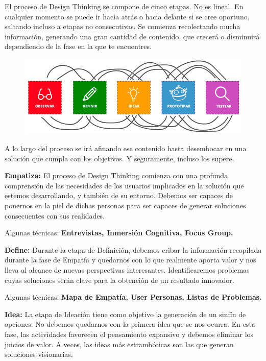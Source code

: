 \documentclass[12pt,twoside,titlepage]{report}
\begin{document}
El proceso de Design Thinking se compone de cinco etapas. No es lineal. En cualquier momento se puede ir hacia atrás o hacia delante si se cree oportuno, saltando incluso a etapas no consecutivas. Se comienza recolectando mucha información, generando una gran cantidad de contenido, que crecerá o disminuirá dependiendo de la fase en la que te encuentres.

\begin{figure}[H] 
    \includegraphics[scale=0.44]{designthinking}
    \centering
    \label{fig:Design Thinking}
\end{figure}

A lo largo del proceso se irá afinando ese contenido hasta desembocar en una solución que cumpla con los objetivos. Y seguramente, incluso los supere.

\textbf{Empatiza:} El proceso de Design Thinking comienza con una profunda comprensión de las necesidades de los usuarios implicados en la solución que estemos desarrollando, y también de su entorno. Debemos ser capaces de ponernos en la piel de dichas personas para ser capaces de generar soluciones consecuentes con sus realidades.

Algunas técnicas: \textbf{Entrevistas, Inmersión Cognitiva, Focus Group.}

\textbf{Define:} Durante la etapa de Definición, debemos cribar la información recopilada durante la fase de Empatía y quedarnos con lo que realmente aporta valor y nos lleva al alcance de nuevas perspectivas interesantes. Identificaremos problemas cuyas soluciones serán clave para la obtención de un resultado innovador.

Algunas técnicas: \textbf{Mapa de Empatía, User Personas, Listas de Problemas.}

\textbf{Idea:} La etapa de Ideación tiene como objetivo la generación de un sinfín de opciones. No debemos quedarnos con la primera idea que se nos ocurra. En esta fase, las actividades favorecen el pensamiento expansivo y debemos eliminar los juicios de valor. A veces, las ideas más estrambóticas son las que generan soluciones visionarias.
\end{document}
